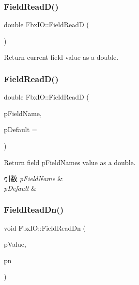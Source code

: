 \subsubsection{\texorpdfstring{Field\+Read\+D()}{FieldReadD()}\hspace{0.1cm}{\footnotesize\ttfamily [1/2]}}
{\footnotesize\ttfamily double Fbx\+I\+O\+::\+Field\+ReadD (\begin{DoxyParamCaption}{ }\end{DoxyParamCaption})}



Return current field value as a double. 

\mbox{\label{class_fbx_i_o_ae5c544d1abe78f6bab1d6e936ded755c}} 
\subsubsection{\texorpdfstring{Field\+Read\+D()}{FieldReadD()}\hspace{0.1cm}{\footnotesize\ttfamily [2/2]}}
{\footnotesize\ttfamily double Fbx\+I\+O\+::\+Field\+ReadD (\begin{DoxyParamCaption}\item[{const char $\ast$}]{p\+Field\+Name,  }\item[{double}]{p\+Default = {} }\end{DoxyParamCaption})}

Return field p\+Field\+Name\textquotesingle{}s value as a double. 
\begin{DoxyParams}{引数}
{\em p\+Field\+Name} & \\
\hline
{\em p\+Default} & \\
\hline
\end{DoxyParams}
\mbox{\label{class_fbx_i_o_a43480db206d7963bc225a7b0c2d7bec1}} 
\subsubsection{\texorpdfstring{Field\+Read\+Dn()}{FieldReadDn()}\hspace{0.1cm}{\footnotesize\ttfamily [1/2]}}
{\footnotesize\ttfamily void Fbx\+I\+O\+::\+Field\+Read\+Dn (\begin{DoxyParamCaption}\item[{double $\ast$}]{p\+Value,  }\item[{\hyperlink{fbxtypes_8h_ae9fb141d8158a730aa85ec5ff2ea3f6b}{Fbx\+U\+Int}}]{pn }\end{DoxyParamCaption})}

